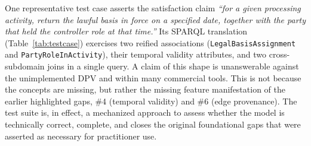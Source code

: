 \documentclass[10pt,letterpaper,twocolumn,twoside]{rho-class/rho}
\begin{document}
One representative test case asserts the satisfaction claim \emph{``for a given processing activity, return the lawful basis in force on a specified date, together with the party that held the controller role at that time.''} Its SPARQL translation (Table~\ref{tab:testcase}) exercises two reified associations (\texttt{LegalBasisAssignment} and \texttt{PartyRoleInActivity}), their temporal validity attributes, and two cross-subdomain joins in a single query. A claim of this shape is unanswerable against the unimplemented DPV and within many commercial tools. This is not because the concepts are missing, but rather the missing feature manifestation of the earlier highlighted gaps, \#4 (temporal validity) and \#6 (edge provenance). The test suite is, in effect, a mechanized approach to assess whether the model is technically correct, complete, and closes the original foundational gaps that were asserted as necessary for practitioner use.
\end{document}
